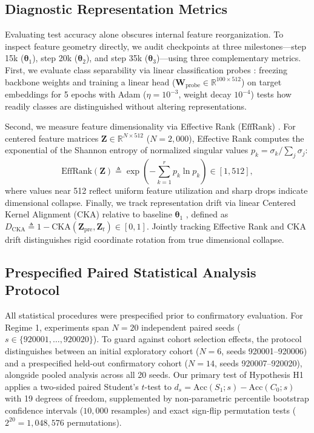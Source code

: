 \documentclass[10pt]{article}
\newcommand{\EffRank}{\mathrm{EffRank}}
\newcommand{\Dcka}{D_{\mathrm{CKA}}}
\begin{document}
\subsection{Diagnostic Representation Metrics}\label{subsec:protocol_diagnostics}
Evaluating test accuracy alone obscures internal feature reorganization. To inspect feature geometry directly, we audit checkpoints at three milestones---step 15k ($\bm{\theta}_1$), step 20k ($\bm{\theta}_2$), and step 35k ($\bm{\theta}_3$)---using three complementary metrics. First, we evaluate class separability via linear classification probes \cite{alain2017understanding,belinkov2022probing}: freezing backbone weights and training a linear head ($\bm{W}_{\mathrm{probe}} \in \mathbb{R}^{100 \times 512}$) on target embeddings for 5 epochs with Adam ($\eta = 10^{-3}$, weight decay $10^{-4}$) tests how readily classes are distinguished without altering representations.

Second, we measure feature dimensionality via Effective Rank ($\EffRank$) \cite{roy2007effective,begga2026preserving}. For centered feature matrices $\bm{Z} \in \mathbb{R}^{N \times 512}$ ($N = 2{,}000$), Effective Rank computes the exponential of the Shannon entropy of normalized singular values $p_k = \sigma_k / \sum_j \sigma_j$:
\begin{equation}\label{eq:effrank}
    \EffRank(\bm{Z}) \triangleq \exp\left( -\sum_{k=1}^r p_k \ln p_k \right) \in [1, 512],
\end{equation}
where values near 512 reflect uniform feature utilization and sharp drops indicate dimensional collapse. Finally, we track representation drift via linear Centered Kernel Alignment (CKA) relative to baseline $\bm{\theta}_1$ \cite{kornblith2019similarity}, defined as $\Dcka \triangleq 1 - \mathrm{CKA}(\bm{Z}_{\mathrm{pre}}, \bm{Z}_t) \in [0, 1]$. Jointly tracking Effective Rank and CKA drift distinguishes rigid coordinate rotation from true dimensional collapse.

\subsection{Prespecified Paired Statistical Analysis Protocol}\label{subsec:protocol_statistics}
All statistical procedures were prespecified prior to confirmatory evaluation. For Regime 1, experiments span $N = 20$ independent paired seeds ($s \in \{920001, \dots, 920020\}$). To guard against cohort selection effects, the protocol distinguishes between an initial exploratory cohort ($N = 6$, seeds 920001--920006) and a prespecified held-out confirmatory cohort ($N = 14$, seeds 920007--920020), alongside pooled analysis across all 20 seeds. Our primary test of Hypothesis H1 applies a two-sided paired Student's $t$-test to $d_s = \mathrm{Acc}(S_1; s) - \mathrm{Acc}(C_0; s)$ with 19 degrees of freedom, supplemented by non-parametric percentile bootstrap confidence intervals ($10{,}000$ resamples) and exact sign-flip permutation tests ($2^{20} = 1{,}048{,}576$ permutations).
\end{document}
